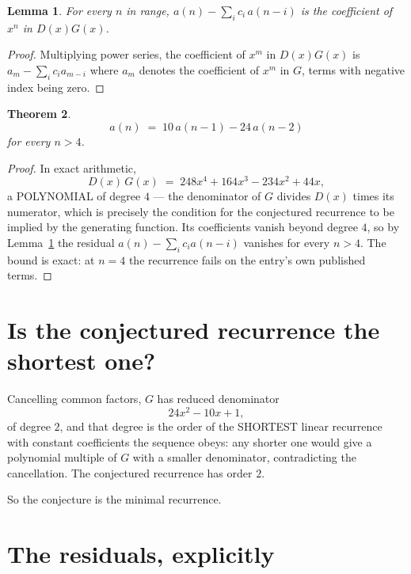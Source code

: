 \documentclass[11pt,a4paper]{article}
\theoremstyle{plain}
\newtheorem{theorem}{Theorem}
\newtheorem{lemma}[theorem]{Lemma}
\theoremstyle{definition}
\begin{document}
\begin{lemma}\label{lem:key}
For every $n$ in range, $a(n)-\sum_i c_i\,a(n-i)$ is the coefficient of $x^{n}$ in
$D(x)G(x)$.
\end{lemma}

\begin{proof}
Multiplying power series, the coefficient of $x^{m}$ in $D(x)G(x)$ is
$a_m-\sum_i c_i a_{m-i}$ where $a_m$ denotes the coefficient of $x^{m}$ in $G$, terms with
negative index being zero.
\end{proof}

\begin{theorem}
\[
a(n)\;=\;10\,a(n-1) - 24\,a(n-2)
\]
for every $n>4$.
\end{theorem}

\begin{proof}
In exact arithmetic,
\[
D(x)\,G(x)\;=\;248 x^{4} + 164 x^{3} - 234 x^{2} + 44 x,
\]
a POLYNOMIAL of degree $4$ --- the denominator of $G$ divides $D(x)$ times its numerator,
which is precisely the condition for the conjectured recurrence to be implied by the
generating function. Its coefficients vanish beyond degree $4$, so by
Lemma~\ref{lem:key} the residual $a(n)-\sum_ic_ia(n-i)$ vanishes for every
$n>4$. The bound is exact: at $n=4$ the recurrence fails on the entry's own published terms.
\end{proof}

\section{Is the conjectured recurrence the shortest one?}

Cancelling common factors, $G$ has reduced denominator
\[
24 x^{2} - 10 x + 1,
\]
of degree $2$, and that degree is the order of the SHORTEST linear recurrence with
constant coefficients the sequence obeys: any shorter one would give a polynomial multiple of
$G$ with a smaller denominator, contradicting the cancellation. The conjectured recurrence has
order $2$.

So the conjecture is the minimal recurrence.

\section{The residuals, explicitly}
\end{document}
